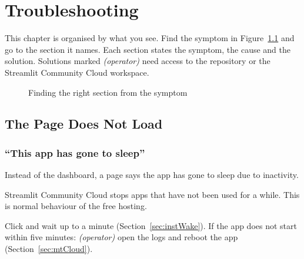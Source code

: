 %
%
%


\chapter{Troubleshooting}
\label{chap:troubleshooting}

This chapter is organised by what you see. Find the symptom in Figure~\ref{fig:troubleshootingTree} and go to the section it names. Each section states the symptom, the cause and the solution. Solutions marked \emph{(operator)} need access to the repository or the Streamlit Community Cloud workspace.

\begin{figure}[H]
  \centering
  \resizebox{\linewidth}{!}{}
  \caption{Finding the right section from the symptom}
  \label{fig:troubleshootingTree}
\end{figure}

\section{The Page Does Not Load}
\label{sec:tsPageGroup}

\subsection{``This app has gone to sleep''}
\label{sec:tsSleep}

\begin{description}[style=nextline,leftmargin=0.5cm,font=\normalfont\bfseries]
  \item[Symptom] Instead of the dashboard, a page says the app has gone to sleep due to inactivity.
  \item[Cause] Streamlit Community Cloud stops apps that have not been used for a while. This is normal behaviour of the free hosting.
  \item[Solution] Click  and wait up to a minute (Section~\ref{sec:instWake}). If the app does not start within five minutes: \emph{(operator)} open the logs and reboot the app (Section~\ref{sec:mtCloud}).
\end{description}

